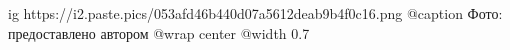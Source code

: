  
 
 
 
 

\ifcmt
  ig https://i2.paste.pics/053afd46b440d07a5612deab9b4f0c16.png
	@caption Фото: предоставлено автором
  @wrap center
  @width 0.7
\fi
